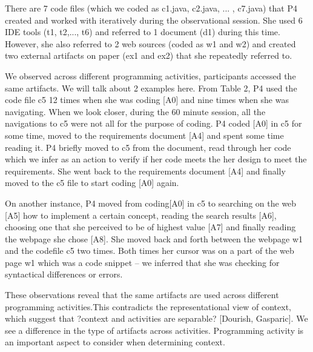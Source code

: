 There are 7 code files (which we coded as c1.java, c2.java, ... , c7.java) that P4 created and worked with iteratively during the observational session. She used 6 IDE tools (t1, t2,..., t6) and referred to 1 document (d1) during this time. However, she also referred to 2 web sources (coded as w1 and w2) and created two external artifacts on paper (ex1 and ex2) that she repeatedly referred to.


We observed across different programming activities, participants accessed the same artifacts. We will talk about 2 examples here. From Table 2, P4 used the code file c5 12 times when she was coding [A0] and nine times when she was navigating. When we look closer, during the 60 minute session, all the navigations to c5 were not all for the purpose of coding. P4 coded [A0] in c5 for some time, moved to the requirements document [A4] and spent some time reading it. P4 briefly moved to c5 from the document, read through her code which we infer as an action to verify if her code meets the her design to meet the requirements. She went back to the requirements document [A4] and finally moved to the c5 file to start coding [A0] again.

On another instance, P4 moved from coding[A0] in c5 to searching on the web [A5] how to implement a certain concept, reading the search results [A6], choosing one that she perceived to be of highest value [A7] and finally reading the webpage she chose [A8]. She moved back and forth between the webpage w1 and the codefile c5 two times. Both times her cursor was on a part of the web page w1 which was a code snippet -- we inferred that she was checking for syntactical differences or errors. 

These observations reveal that the same artifacts are used across different programming activities.This contradicts the representational view of context, which suggest that ?context and activities are separable? [Dourish, Gasparic]. We see a difference in the type of artifacts across activities. Programming activity is an important aspect to consider when determining context. 



